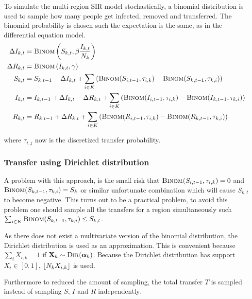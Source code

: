 To simulate the multi-region SIR model stochastically, a binomial distribution is used to sample how many people get infected, removed and transferred. The binomial probability is chosen such the expectation is the same, as in the differential equation model.
\begin{equation*}
\begin{aligned}
\Delta I_{k,t} &= \textsc{Binom}\left(S_{k,t}, \beta \frac{I_{k, t}}{N_k}\right) \\
\Delta R_{k,t} &= \textsc{Binom}\left(I_{k,t}, \gamma\right) \\
S_{k,t} &= S_{k,t-1} - \Delta I_{k,t} + \sum_{i \in K} \left(\textsc{Binom}(S_{i,t-1}, \tau_{i,k}) - \textsc{Binom}(S_{k,t-1}, \tau_{k,i})\right) \\
I_{k,t} &= I_{k,t-1} + \Delta I_{k,t} - \Delta R_{k, t} + \sum_{i \in K} \left(\textsc{Binom}(I_{i,t-1}, \tau_{i,k}) - \textsc{Binom}(I_{k,t-1}, \tau_{k,i})\right) \\
R_{k,t} &= R_{k,t-1} + \Delta R_{k, t} + \sum_{i \in K} \left(\textsc{Binom}(R_{i,t-1}, \tau_{i,k}) - \textsc{Binom}(R_{k,t-1}, \tau_{k,i})\right)
\end{aligned}
\end{equation*}

where $\tau_{i,j}$ now is the discretized transfer probability.

\subsubsection{Transfer using Dirichlet distribution}
A problem with this approach, is the small risk that $\textsc{Binom}(S_{i, t-1}, \tau_{i,k}) = 0$ and $\textsc{Binom}(S_{k, t-1}, \tau_{k,i}) = S_k$ or similar unfortunate combination which will cause $S_{k,t}$ to become negative. This turns out to be a practical problem, to avoid this problem one should sample all the transfers for a region simultaneously such $\sum_{i \in K} \textsc{Binom}(S_{k,t-1}, \tau_{k,i}) \le S_{k, t}$.

As there does not exist a multivariate version of the binomial distribution, the Dirichlet distribution is used as an approximation. This is convenient because $\sum_{i} X_{i,k} = 1$ if $\mathbf{X}_k \sim \textsc{Dir}(\boldsymbol{\alpha}_k)$. Because the Dirichlet distribution has support $X_i \in [0, 1]$, $\floor*{N_k X_{i,k}}$ is used.

Furthermore to reduced the amount of sampling, the total transfer $T$ is sampled instead of sampling $S$, $I$ and $R$ independently.


